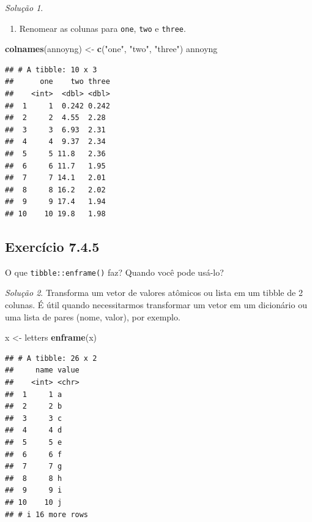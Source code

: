 \documentclass[
]{latex/krantz}
\newenvironment{Shaded}{\begin{snugshade}}{\end{snugshade}}
\newcommand{\FunctionTok}[1]{\textcolor[rgb]{0.13,0.29,0.53}{\textbf{#1}}}
\newcommand{\NormalTok}[1]{#1}
\newcommand{\OtherTok}[1]{\textcolor[rgb]{0.56,0.35,0.01}{#1}}
\newcommand{\StringTok}[1]{\textcolor[rgb]{0.31,0.60,0.02}{#1}}
\providecommand{\tightlist}{%
  \setlength{\itemsep}{0pt}\setlength{\parskip}{0pt}}
\theoremstyle{definition}
\theoremstyle{definition}
\theoremstyle{definition}
\theoremstyle{definition}
\theoremstyle{remark}
\newtheorem*{solution}{Solução}
\begin{document}
\begin{solution}
\begin{enumerate}
\def\labelenumi{\alph{enumi}.}
\setcounter{enumi}{3}
\tightlist
\item
  Renomear as colunas para \texttt{one}, \texttt{two} e \texttt{three}.
\end{enumerate}

\begin{Shaded}
\begin{Highlighting}[]
\FunctionTok{colnames}\NormalTok{(annoyng) }\OtherTok{\textless{}{-}} \FunctionTok{c}\NormalTok{(}\StringTok{"one"}\NormalTok{, }\StringTok{"two"}\NormalTok{, }\StringTok{"three"}\NormalTok{)}
\NormalTok{annoyng}
\end{Highlighting}
\end{Shaded}

\begin{verbatim}
## # A tibble: 10 x 3
##      one    two three
##    <int>  <dbl> <dbl>
##  1     1  0.242 0.242
##  2     2  4.55  2.28 
##  3     3  6.93  2.31 
##  4     4  9.37  2.34 
##  5     5 11.8   2.36 
##  6     6 11.7   1.95 
##  7     7 14.1   2.01 
##  8     8 16.2   2.02 
##  9     9 17.4   1.94 
## 10    10 19.8   1.98
\end{verbatim}

\end{solution}

\hypertarget{exr7-4-5}{%
\subsection*{Exercício 7.4.5}\label{exr7-4-5}}

O que \texttt{tibble::enframe()} faz? Quando você pode usá-lo?

\begin{solution}

Transforma um vetor de valores atômicos ou lista em um tibble de 2 colunas. É útil quando necessitarmos transformar um vetor em um dicionário ou uma lista de pares (nome, valor), por exemplo.

\begin{Shaded}
\begin{Highlighting}[]
\NormalTok{x }\OtherTok{\textless{}{-}}\NormalTok{ letters}
\FunctionTok{enframe}\NormalTok{(x)}
\end{Highlighting}
\end{Shaded}

\begin{verbatim}
## # A tibble: 26 x 2
##     name value
##    <int> <chr>
##  1     1 a    
##  2     2 b    
##  3     3 c    
##  4     4 d    
##  5     5 e    
##  6     6 f    
##  7     7 g    
##  8     8 h    
##  9     9 i    
## 10    10 j    
## # i 16 more rows
\end{verbatim}

\end{solution}
\end{document}
